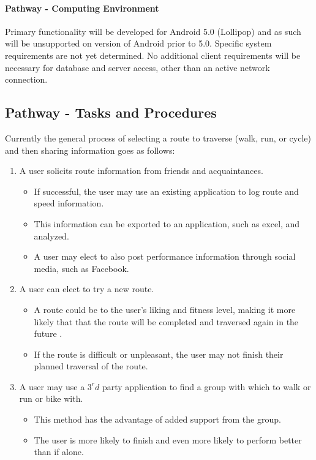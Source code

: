 \documentclass{article}
\begin{document}
\paragraph{Pathway - Computing Environment}
Primary functionality will be developed for Android 5.0 (Lollipop) and as such will be unsupported on version of Android prior to 5.0. Specific system requirements are not yet determined. No additional client requirements will be necessary for database and server access, other than an active network connection.

\subsection{Pathway - Tasks and Procedures}
Currently the general process of selecting a route to traverse (walk, run, or cycle) and then sharing information goes as follows:
\begin{enumerate}
    \item A user solicits route information from friends and acquaintances.
        \begin{itemize}
            \item If successful, the user may use an existing application to log route and speed information.
            \item This information can be exported to an application, such as excel, and analyzed.
            \item A user may elect to also post performance information through social media, such as Facebook.
        \end{itemize}
    \item A user can elect to try a new route.
        \begin{itemize}
            \item A route could be to the user's liking and fitness level, making it more likely that that the route will be completed and traversed again in the future .
            \item If the route is difficult or unpleasant, the user may not finish their planned traversal of the route.
        \end{itemize}
    \item A user may use a $3^rd$ party application to find a group with which to walk or run or bike with.
        \begin{itemize}
            \item This method has the advantage of added support from the group.
            \item The user is more likely to finish and even more likely to perform better than if alone.
        \end{itemize}
\end{enumerate}
\end{document}
